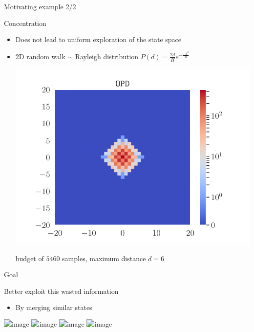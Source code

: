 \documentclass[slideopt,A4,showboxes,svgnames]{beamer}
\begin{document}
\begin{frame}{Motivating example 2/2}
\begin{alertblock}{Concentration}
\begin{itemize}[<+->]
\item Does not lead to uniform exploration of the state space
\item 2D random walk $\sim$ Rayleigh distribution
$P(d) = \frac{2d}{H}e^{-\frac{-d^2}{H}}$

\begin{center}
	\includegraphics[width=0.6\linewidth]{../img/occupations_OPD}
	
	budget of $5460$ samples, maximum distance $d=6$
\end{center}
\end{itemize}
\end{alertblock}
\end{frame}

\begin{frame}{Goal}
\begin{exampleblock}{Better exploit this wasted information}
	\begin{itemize}
		\item<2-4> By \alert{merging} similar states \only<3-4>{into a {\green graph}}
	\end{itemize}
	\begin{center}
		\includegraphics<1>[trim={1.8cm 2.2cm 1.9cm 2.7cm}, clip, width=0.55\linewidth]{img/tree_simple}%
		\includegraphics<2>[trim={1.8cm 2.2cm 1.9cm 2.7cm}, clip, width=0.55\linewidth]{img/tree_merging}%
		\includegraphics<3>[trim={1.8cm 2.2cm 1.9cm 2.7cm}, clip, width=0.55\linewidth]{img/tree_merged}%
		\includegraphics<4>[trim={1.8cm 1.2cm 1.9cm 0.8cm}, clip, width=0.55\linewidth]{img/graph_simple}%
	\end{center}
\end{exampleblock}
\end{frame}
\end{document}
